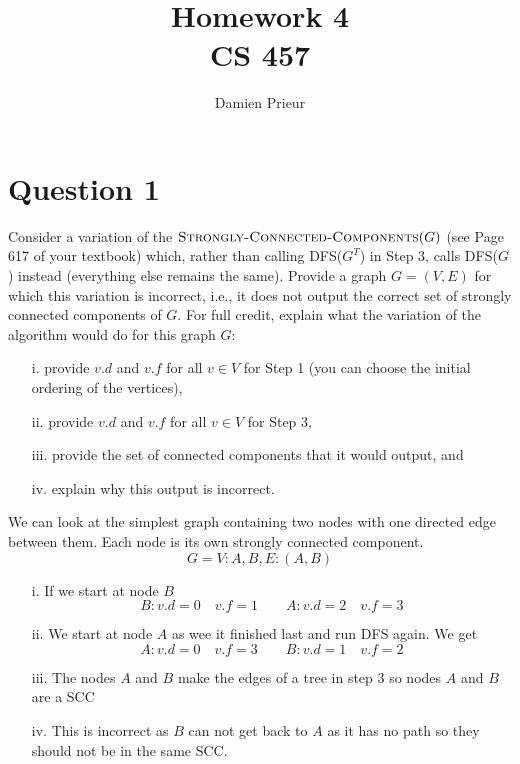 \documentclass{article}
\author{Damien Prieur}
\title{Homework 4 \\ CS 457}
\date{}
\begin{document}
\maketitle

\section*{Question 1}
Consider a variation of the $\textsc{Strongly-Connected-Components}(G)$ (see Page 617 of your textbook) which, rather than calling DFS($G^T$) in Step 3, calls DFS($G$) instead (everything else remains the same).
Provide a graph $G=(V, E)$ for which this variation is incorrect, i.e., it does not output the correct set of strongly connected components of $G$.
For full credit, explain what the variation of the algorithm would do for this graph $G$:
\begin{itemize}
\item[i.] provide $v.d$ and $v.f$ for all $v\in V$ for Step 1 (you can choose the initial ordering of the vertices),
\item[ii.] provide $v.d$ and $v.f$ for all $v\in V$ for Step 3,
\item[iii.] provide the set of connected components that it would output, and
\item[iv.] explain why this output is incorrect.
\end{itemize}

We can look at the simplest graph containing two nodes with one directed edge between them. Each node is its own strongly connected component.
$$G={V:{A,B}, E:{(A,B)}}$$

\begin{itemize}
\item[i.] If we start at node $B$ \
$$B : v.d = 0 \quad v.f = 1 \qquad A : v.d = 2 \quad v.f = 3$$
\item[ii.] We start at node $A$ as wee it finished last and run DFS again. We get \\
$$A : v.d = 0 \quad v.f = 3 \qquad B : v.d = 1 \quad v.f = 2$$
\item[iii.] The nodes $A$ and $B$ make the edges of a tree in step 3 so nodes $A$ and $B$ are a SCC
\item[iv.] This is incorrect as $B$ can not get back to $A$ as it has no path so they should not be in the same SCC.
\end{itemize}
\end{document}
